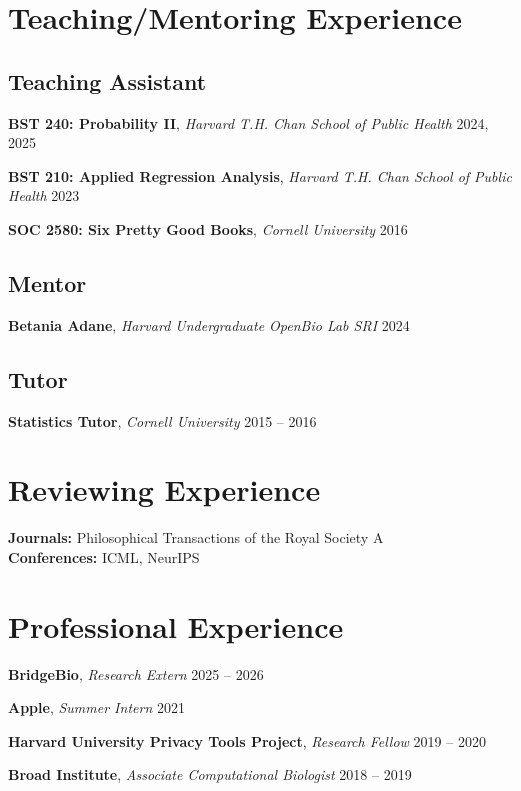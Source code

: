 \documentclass[11pt, letterpaper]{article}
\newcommand{\cventryone}[4]{
  \noindent\textbf{#2}, \textit{#3} \hfill #1 %
  \ifstrempty{#4}{}{ \\ #4 }%
  \par\vspace{2pt} %
}
\begin{document}
\section{Teaching/Mentoring Experience}

\subsection{Teaching Assistant}
\cventryone{2024, 2025}
    {BST 240: Probability II}
    {Harvard T.H. Chan School of Public Health}
    {}

\cventryone{2023}
    {BST 210: Applied Regression Analysis}
    {Harvard T.H. Chan School of Public Health}
    {}

\cventryone{2016}
    {SOC 2580: Six Pretty Good Books}
    {Cornell University}
    {}

\subsection{Mentor}
\cventryone{2024}
    {Betania Adane}
    {Harvard Undergraduate OpenBio Lab SRI}
    {}

\subsection{Tutor}
\cventryone{2015 -- 2016}
    {Statistics Tutor}
    {Cornell University}
    {}

\section{Reviewing Experience}
\textbf{Journals:} Philosophical Transactions of the Royal Society A \\
\textbf{Conferences:} ICML, NeurIPS


\section{Professional Experience}

\cventryone{2025 -- 2026}
    {BridgeBio}
    {Research Extern}
    {}

\cventryone{2021}
    {Apple}
    {Summer Intern}
    {}

\cventryone{2019 -- 2020}
    {Harvard University Privacy Tools Project}
    {Research Fellow}
    {}

\cventryone{2018 -- 2019}
    {Broad Institute}
    {Associate Computational Biologist}
    {}
\end{document}
